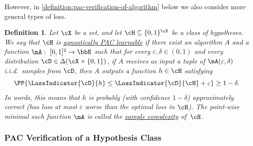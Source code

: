 \documentclass[11pt]{article}
\newtheorem{definition}[theorem]{Definition}
\begin{document}
However, in \cref{definition:pac-verification-of-algorithm} below we also consider more general types of loss. 

\begin{definition}
	Let $\cX$ be a set, and let $\cH \subseteq \{0,1\}^\cX$ be a class of hypotheses. We say that $\cH$ is \ul{agnostically PAC learnable} if there exist an algorithm $A$ and a function $\mA:~[0,1]^2 \rightarrow \bbN$ such that for every $\varepsilon,\delta \in (0,1)$ and every distribution ${\cD \in \Delta(\cX \times \{0,1\})}$, if $A$ receives as input a tuple of $\mA(\varepsilon,\delta)$ i.i.d.\ samples from $\cD$, then $A$ outputs a function $h \in \cH$ satisfying
	\[
	\PP{\LossIndicator{\cD}{h} \leq \LossIndicator{\cD}{\cH} + \varepsilon} \geq 1-\delta.
	\]
	In words, this means that $h$ is probably (with confidence $1-\delta$) approximately correct (has loss at most $\varepsilon$ worse than the optimal loss in $\cH$). The point-wise minimal such function $\mA$ is called the \ul{sample complexity} of~$\cH$.
\end{definition}

\subsubsection*{PAC Verification of a Hypothesis Class}
\end{document}
